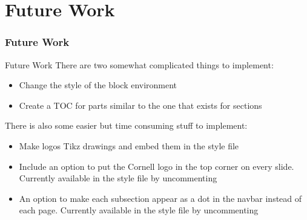 \documentclass[serif]{beamer}
\begin{document}
\part{Future Work}

\section{Future Work}

\begin{frame}{Future Work}
There are two somewhat complicated things to implement:
\begin{itemize}
\item Change the style of the block environment
\item Create a TOC for parts similar to the one that exists for sections
\end{itemize}
There is also some easier but time consuming stuff to implement:
\begin{itemize}
\item Make logos Tikz drawings and embed them in the style file
\item Include an option to put the Cornell logo in the top corner on every slide. Currently available in the style file by uncommenting
\item An option to make each subsection appear as a dot in the navbar instead of each page. Currently available in the style file by uncommenting
\end{itemize}
\end{frame}
\end{document}

